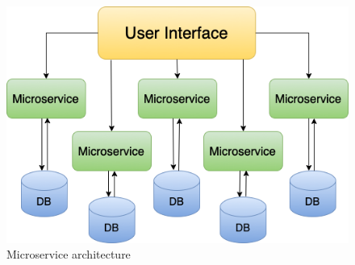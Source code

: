 \begin{figure}[hp]
\centering
\includegraphics[scale=0.73]{../png/microservices.png}
\caption{Microservice architecture}\label{picture:mvp}
\end{figure}


